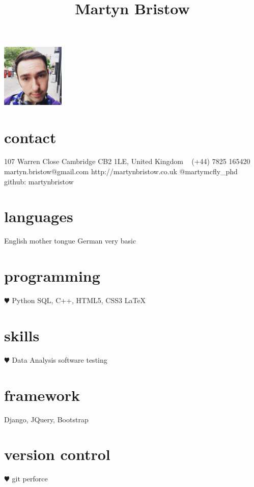 \documentclass[]{cv-style}          %
\begin{document}
\lastupdated
\title{Martyn Bristow}


\begin{aside}
%
\includegraphics[width=3cm]{martyn.jpg}
\section{contact}
107 Warren Close
\hspace*{25pt} Cambridge
\hspace*{25pt} CB2 1LE, 
\hspace*{25pt} United Kingdom
~
(+44) 7825 165420
~
martyn.bristow@gmail.com
http://martynbristow.co.uk
@martymcfly_phd
github: martynbristow
\section{languages}
English mother tongue
German very basic
%
\section{programming}
{\color{red} $\varheartsuit$} Python
SQL, C++,
HTML5, CSS3
\LaTeX{}
\section{skills}
{\color{red} $\varheartsuit$} Data Analysis
software testing
\section{framework}
Django, JQuery, Bootstrap
\section{version control}
{\color{red} $\varheartsuit$} git
perforce
%
\end{aside}
\end{document}
